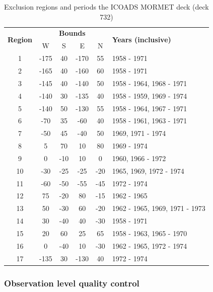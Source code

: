 \begin{table}
\centering
\caption{Exclusion regions and periods the ICOADS MORMET deck (deck 732)}
\label{tab:mormet}
\begin{tabular}{|c|c|c|c|c|l|}
\hline
\multirow{2}{*}{\bfseries Region} & \multicolumn{4}{c|}{\bfseries Bounds } & \multirow{2}{*}{\bfseries Years (inclusive)} \\ \cline{2-5}
   &   W  &  S  &    E &   N & \\\hline
1  & -175 &  40 & -170 &  55 & 1958 - 1971 \\\hline
2  & -165 &  40 & -160 &  60 & 1958 - 1971 \\\hline
3  & -145 &  40 & -140 &  50 & 1958 - 1964, 1968 - 1971 \\\hline
4  & -140 &  30 & -135 &  40 & 1958 - 1959, 1969 - 1974 \\\hline
5  & -140 &  50 & -130 &  55 & 1958 - 1964, 1967 - 1971 \\\hline
6  &  -70 &  35 &  -60 &  40 & 1958 - 1961, 1963 - 1971 \\\hline
7  &  -50 &  45 &  -40 &  50 & 1969, 1971 - 1974 \\\hline
8  &    5 &  70 &   10 &  80 & 1969 - 1974 \\\hline
9  &    0 & -10 &   10 &   0 & 1960, 1966 - 1972 \\\hline
10 &  -30 & -25 &  -25 & -20 & 1965, 1969, 1972 - 1974 \\\hline
11 &  -60 & -50 &  -55 & -45 & 1972 - 1974 \\\hline
12 &   75 & -20 &   80 & -15 & 1962 - 1965 \\\hline
13 &   50 & -30 &   60 & -20 & 1962 - 1965, 1969, 1971 - 1973 \\\hline
14 &   30 & -40 &   40 & -30 & 1958 - 1971 \\\hline
15 &   20 &  60 &   25 &  65 & 1958 - 1963, 1965 - 1970 \\\hline
16 &    0 & -40 &   10 & -30 & 1962 - 1965, 1972 - 1974 \\\hline
17 & -135 &  30 & -130 &  40 & 1972 - 1974 \\\hline
\end{tabular}
\end{table}

\FloatBarrier
\subsubsection{Observation level quality control} \label{obs-qc}

